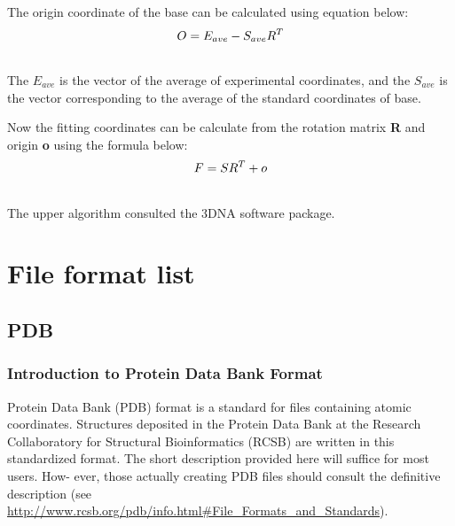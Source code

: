 \documentclass[letterpaper,10pt,english]{sphinxmanual}
\begin{document}
The origin coordinate of the base can be calculated using equation below:
\begin{gather}
\begin{split}O=E_{ave}-S_{ave}R^{T}\end{split}\notag\\\begin{split}\end{split}\notag
\end{gather}
The $E_{ave}$ is the vector of the average of experimental coordinates,
and the $S_{ave}$ is the vector corresponding to the average of the standard coordinates of base.

Now the fitting coordinates can be calculate from the rotation matrix \textbf{R} and origin \textbf{o} using the formula below:
\begin{gather}
\begin{split}F=SR^T+o\end{split}\notag\\\begin{split}\end{split}\notag
\end{gather}
The upper algorithm consulted the 3DNA software package.


\chapter{File format list}
\label{documentation_pages/file_format::doc}\label{documentation_pages/file_format:file-format-list}

\section{PDB}
\label{documentation_pages/file_format:pdb}

\subsection{Introduction to Protein Data Bank Format}
\label{documentation_pages/file_format:introduction-to-protein-data-bank-format}
Protein Data Bank (PDB) format is a standard for files containing atomic coordinates. Structures
deposited in the Protein Data Bank at the Research Collaboratory for Structural Bioinformatics (RCSB) are
written in this standardized format. The short description provided here will suffice for most users. How-
ever, those actually creating PDB files should consult the definitive description (see
\href{http://www.rcsb.org/pdb/info.html\#File\_Formats\_and\_Standards}{http://www.rcsb.org/pdb/info.html\#File\_Formats\_and\_Standards}).
\end{document}
